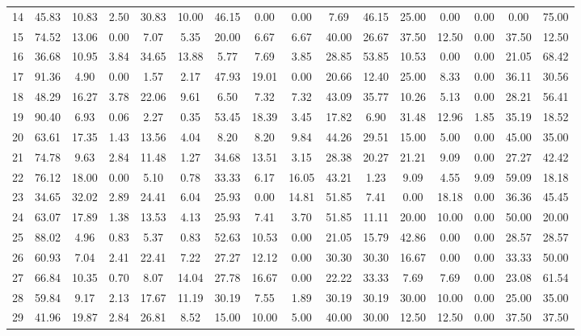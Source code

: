 \documentclass[12pt,authoryear]{elsarticle}
\begin{document}
\begin{table}[]
{\begin{tabular}{|c |c  c  c  c  c | c  c  c  c   c | c  c  c  c  c |}
  14 & 45.83 & 10.83 & 2.50 & 30.83 & 10.00 & 46.15 &  0.00 &  0.00 &  7.69 & 46.15 & 25.00 &  0.00 &  0.00 &  0.00 & 75.00 \\ 
  15 & 74.52 & 13.06 & 0.00 &  7.07 &  5.35 & 20.00 &  6.67 &  6.67 & 40.00 & 26.67 & 37.50 & 12.50 &  0.00 & 37.50 & 12.50 \\ 
  16 & 36.68 & 10.95 & 3.84 & 34.65 & 13.88 &  5.77 &  7.69 &  3.85 & 28.85 & 53.85 & 10.53 &  0.00 &  0.00 & 21.05 & 68.42 \\ 
  17 & 91.36 &  4.90 & 0.00 &  1.57 &  2.17 & 47.93 & 19.01 &  0.00 & 20.66 & 12.40 & 25.00 &  8.33 &  0.00 & 36.11 & 30.56 \\ 
  18 & 48.29 & 16.27 & 3.78 & 22.06 &  9.61 &  6.50 &  7.32 &  7.32 & 43.09 & 35.77 & 10.26 &  5.13 &  0.00 & 28.21 & 56.41 \\ 
  19 & 90.40 &  6.93 & 0.06 &  2.27 &  0.35 & 53.45 & 18.39 &  3.45 & 17.82 &  6.90 & 31.48 & 12.96 &  1.85 & 35.19 & 18.52 \\ 
  20 & 63.61 & 17.35 & 1.43 & 13.56 &  4.04 &  8.20 &  8.20 &  9.84 & 44.26 & 29.51 & 15.00 &  5.00 &  0.00 & 45.00 & 35.00 \\ 
  21 & 74.78 &  9.63 & 2.84 & 11.48 &  1.27 & 34.68 & 13.51 &  3.15 & 28.38 & 20.27 & 21.21 &  9.09 &  0.00 & 27.27 & 42.42 \\ 
  22 & 76.12 & 18.00 & 0.00 &  5.10 &  0.78 & 33.33 &  6.17 & 16.05 & 43.21 &  1.23 &  9.09 &  4.55 &  9.09 & 59.09 & 18.18 \\ 
  23 & 34.65 & 32.02 & 2.89 & 24.41 &  6.04 & 25.93 &  0.00 & 14.81 & 51.85 &  7.41 &  0.00 & 18.18 &  0.00 & 36.36 & 45.45 \\ 
  24 & 63.07 & 17.89 & 1.38 & 13.53 &  4.13 & 25.93 &  7.41 &  3.70 & 51.85 & 11.11 & 20.00 & 10.00 &  0.00 & 50.00 & 20.00 \\ 
  25 & 88.02 &  4.96 & 0.83 &  5.37 &  0.83 & 52.63 & 10.53 &  0.00 & 21.05 & 15.79 & 42.86 &  0.00 &  0.00 & 28.57 & 28.57 \\ 
  26 & 60.93 &  7.04 & 2.41 & 22.41 &  7.22 & 27.27 & 12.12 &  0.00 & 30.30 & 30.30 & 16.67 &  0.00 &  0.00 & 33.33 & 50.00 \\ 
  27 & 66.84 & 10.35 & 0.70 &  8.07 & 14.04 & 27.78 & 16.67 &  0.00 & 22.22 & 33.33 &  7.69 &  7.69 &  0.00 & 23.08 & 61.54 \\ 
  28 & 59.84 &  9.17 & 2.13 & 17.67 & 11.19 & 30.19 &  7.55 &  1.89 & 30.19 & 30.19 & 30.00 & 10.00 &  0.00 & 25.00 & 35.00 \\ 
  29 & 41.96 & 19.87 & 2.84 & 26.81 &  8.52 & 15.00 & 10.00 &  5.00 & 40.00 & 30.00 & 12.50 & 12.50 &  0.00 & 37.50 & 37.50 \\ 

\end{tabular}}
\end{table}
\end{document}
